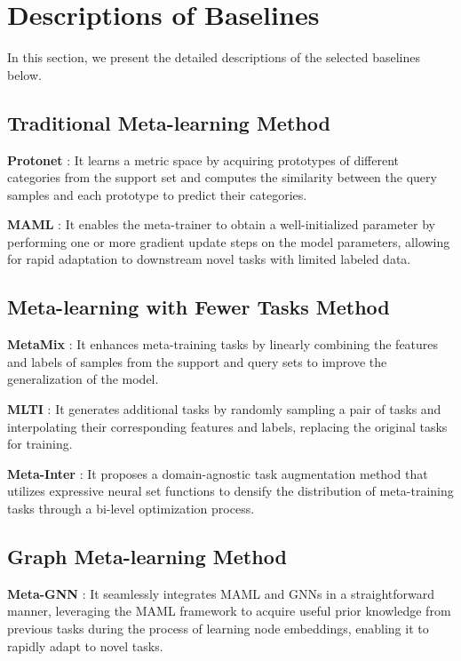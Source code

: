 \section{Descriptions of Baselines}
\label{baseline}
In this section, we present the detailed descriptions of the selected baselines below.

\subsection{Traditional Meta-learning Method}
\noindent \textbf{Protonet} \cite{snell2017prototypical}: It learns a metric space by acquiring prototypes of different categories from the support set and computes the similarity between the query samples and each prototype to predict their categories.

\noindent \textbf{MAML} \cite{finn2017model}: It enables the meta-trainer to obtain a well-initialized parameter by performing one or more gradient update steps on the model parameters, allowing for rapid adaptation to downstream novel tasks with limited labeled data.

\subsection{Meta-learning with Fewer Tasks Method}
\noindent \textbf{MetaMix} \cite{yao2021improving}: It enhances meta-training tasks by linearly combining the features and labels of samples from the support and query sets to improve the generalization of the model.

\noindent \textbf{MLTI} \cite{yao2021meta}: It generates additional tasks by randomly sampling a pair of tasks and interpolating their corresponding features and labels, replacing the original tasks for training.

\noindent \textbf{Meta-Inter} \cite{lee2022set}: It proposes a domain-agnostic task augmentation method that utilizes expressive neural set functions to densify the distribution of meta-training tasks through a bi-level optimization process.

\subsection{Graph Meta-learning Method}
\noindent \textbf{Meta-GNN} \cite{zhou2019meta}: It seamlessly integrates MAML and GNNs in a straightforward manner, leveraging the MAML framework to acquire useful prior knowledge from previous tasks during the process of learning node embeddings, enabling it to rapidly adapt to novel tasks.

